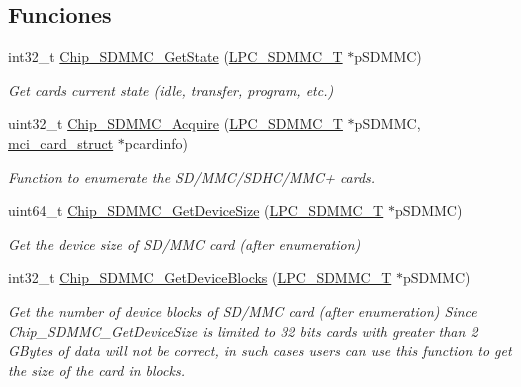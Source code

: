 \subsection*{Funciones}
\begin{DoxyCompactItemize}
\item 
int32\+\_\+t \hyperlink{group___s_d_m_m_c__18_x_x__43_x_x_gaa3fa974f4b97abae649e0c85845d0ba5}{Chip\+\_\+\+S\+D\+M\+M\+C\+\_\+\+Get\+State} (\hyperlink{struct_l_p_c___s_d_m_m_c___t}{L\+P\+C\+\_\+\+S\+D\+M\+M\+C\+\_\+T} $\ast$p\+S\+D\+M\+MC)
\begin{DoxyCompactList}\small\item\em Get card\textquotesingle{}s current state (idle, transfer, program, etc.) \end{DoxyCompactList}\item 
uint32\+\_\+t \hyperlink{group___s_d_m_m_c__18_x_x__43_x_x_ga54405e71b2cefcdf5d91cfcb36ef24c0}{Chip\+\_\+\+S\+D\+M\+M\+C\+\_\+\+Acquire} (\hyperlink{struct_l_p_c___s_d_m_m_c___t}{L\+P\+C\+\_\+\+S\+D\+M\+M\+C\+\_\+T} $\ast$p\+S\+D\+M\+MC, \hyperlink{group___s_d_m_m_c__18_x_x__43_x_x_gaa558c8e6f8957a2a9014f575b7beabe5}{mci\+\_\+card\+\_\+struct} $\ast$pcardinfo)
\begin{DoxyCompactList}\small\item\em Function to enumerate the S\+D/\+M\+M\+C/\+S\+D\+H\+C/\+M\+M\+C+ cards. \end{DoxyCompactList}\item 
uint64\+\_\+t \hyperlink{group___s_d_m_m_c__18_x_x__43_x_x_ga1868dbbd245105bdb93679c1c975532f}{Chip\+\_\+\+S\+D\+M\+M\+C\+\_\+\+Get\+Device\+Size} (\hyperlink{struct_l_p_c___s_d_m_m_c___t}{L\+P\+C\+\_\+\+S\+D\+M\+M\+C\+\_\+T} $\ast$p\+S\+D\+M\+MC)
\begin{DoxyCompactList}\small\item\em Get the device size of S\+D/\+M\+MC card (after enumeration) \end{DoxyCompactList}\item 
int32\+\_\+t \hyperlink{group___s_d_m_m_c__18_x_x__43_x_x_gad6a8510859b4572e2caa914c236dcae0}{Chip\+\_\+\+S\+D\+M\+M\+C\+\_\+\+Get\+Device\+Blocks} (\hyperlink{struct_l_p_c___s_d_m_m_c___t}{L\+P\+C\+\_\+\+S\+D\+M\+M\+C\+\_\+T} $\ast$p\+S\+D\+M\+MC)
\begin{DoxyCompactList}\small\item\em Get the number of device blocks of S\+D/\+M\+MC card (after enumeration) Since Chip\+\_\+\+S\+D\+M\+M\+C\+\_\+\+Get\+Device\+Size is limited to 32 bits cards with greater than 2 G\+Bytes of data will not be correct, in such cases users can use this function to get the size of the card in blocks. \end{DoxyCompactList}\item 

\end{DoxyCompactItemize}
